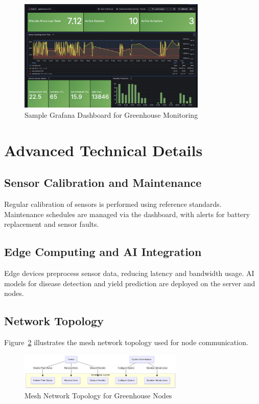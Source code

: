 \documentclass[12pt,a4paper]{article}
\begin{document}
\begin{figure}[H]
    \centering
    \includegraphics[width=0.8\textwidth]{images/NodeDashboard.png}
    \caption{Sample Grafana Dashboard for Greenhouse Monitoring}\label{fig:dashboard}
\end{figure}

\section{Advanced Technical Details}
\subsection{Sensor Calibration and Maintenance}
Regular calibration of sensors is performed using reference standards. Maintenance schedules are managed via the dashboard, with alerts for battery replacement and sensor faults.

\subsection{Edge Computing and AI Integration}
Edge devices preprocess sensor data, reducing latency and bandwidth usage. AI models for disease detection and yield prediction are deployed on the server and nodes.

\subsection{Network Topology}
Figure~\ref{fig:network} illustrates the mesh network topology used for node communication.

\begin{figure}[H]
    \centering
    \includegraphics[width=0.7\textwidth]{images/useCaseDiagram.png}
    \caption{Mesh Network Topology for Greenhouse Nodes}\label{fig:network}
\end{figure}
\end{document}
